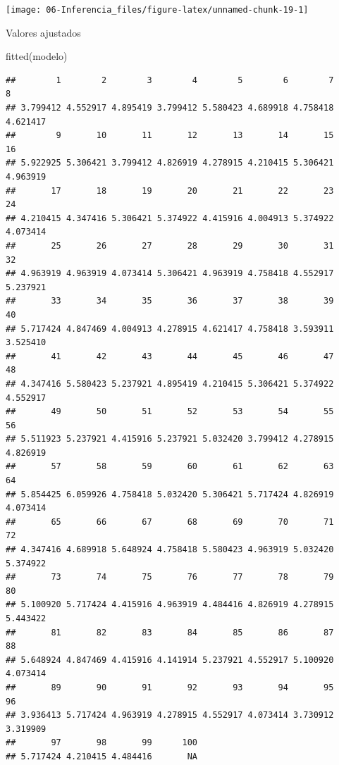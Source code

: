 \documentclass[
]{book}
\newenvironment{Shaded}{\begin{snugshade}}{\end{snugshade}}
\newcommand{\FunctionTok}[1]{\textcolor[rgb]{0.00,0.00,0.00}{#1}}
\newcommand{\NormalTok}[1]{#1}
\theoremstyle{break}
\theoremstyle{nonumberplain}
\begin{document}
\begin{center}\texttt{[image: 06-Inferencia\_files/figure-latex/unnamed-chunk-19-1]} \end{center}

Valores ajustados

\begin{Shaded}
\begin{Highlighting}[]
\FunctionTok{fitted}\NormalTok{(modelo)}
\end{Highlighting}
\end{Shaded}

\begin{verbatim}
##        1        2        3        4        5        6        7        8 
## 3.799412 4.552917 4.895419 3.799412 5.580423 4.689918 4.758418 4.621417 
##        9       10       11       12       13       14       15       16 
## 5.922925 5.306421 3.799412 4.826919 4.278915 4.210415 5.306421 4.963919 
##       17       18       19       20       21       22       23       24 
## 4.210415 4.347416 5.306421 5.374922 4.415916 4.004913 5.374922 4.073414 
##       25       26       27       28       29       30       31       32 
## 4.963919 4.963919 4.073414 5.306421 4.963919 4.758418 4.552917 5.237921 
##       33       34       35       36       37       38       39       40 
## 5.717424 4.847469 4.004913 4.278915 4.621417 4.758418 3.593911 3.525410 
##       41       42       43       44       45       46       47       48 
## 4.347416 5.580423 5.237921 4.895419 4.210415 5.306421 5.374922 4.552917 
##       49       50       51       52       53       54       55       56 
## 5.511923 5.237921 4.415916 5.237921 5.032420 3.799412 4.278915 4.826919 
##       57       58       59       60       61       62       63       64 
## 5.854425 6.059926 4.758418 5.032420 5.306421 5.717424 4.826919 4.073414 
##       65       66       67       68       69       70       71       72 
## 4.347416 4.689918 5.648924 4.758418 5.580423 4.963919 5.032420 5.374922 
##       73       74       75       76       77       78       79       80 
## 5.100920 5.717424 4.415916 4.963919 4.484416 4.826919 4.278915 5.443422 
##       81       82       83       84       85       86       87       88 
## 5.648924 4.847469 4.415916 4.141914 5.237921 4.552917 5.100920 4.073414 
##       89       90       91       92       93       94       95       96 
## 3.936413 5.717424 4.963919 4.278915 4.552917 4.073414 3.730912 3.319909 
##       97       98       99      100 
## 5.717424 4.210415 4.484416       NA
\end{verbatim}
\end{document}
